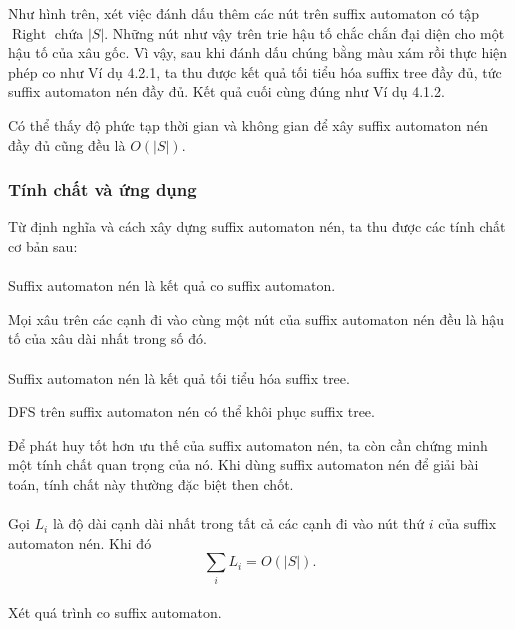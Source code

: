 \documentclass[11pt]{article}
\begin{document}
Như hình trên, xét việc đánh dấu thêm các nút trên suffix automaton có tập
\(\operatorname{Right}\) chứa \(|S|\). Những nút như vậy trên trie hậu tố chắc
chắn đại diện cho một hậu tố của xâu gốc. Vì vậy, sau khi đánh dấu chúng bằng
màu xám rồi thực hiện phép co như Ví dụ 4.2.1, ta thu được kết quả tối tiểu hóa
suffix tree đầy đủ, tức suffix automaton nén đầy đủ. Kết quả cuối cùng đúng như
Ví dụ 4.1.2.

Có thể thấy độ phức tạp thời gian và không gian để xây suffix automaton nén đầy
đủ cũng đều là \(O(|S|)\).

\subsubsection{Tính chất và ứng dụng}

Từ định nghĩa và cách xây dựng suffix automaton nén, ta thu được các tính chất
cơ bản sau:

\paragraph{}
Suffix automaton nén là kết quả co suffix automaton.

Mọi xâu trên các cạnh đi vào cùng một nút của suffix automaton nén đều là hậu
tố của xâu dài nhất trong số đó.

\paragraph{}
Suffix automaton nén là kết quả tối tiểu hóa suffix tree.

DFS trên suffix automaton nén có thể khôi phục suffix tree.

Để phát huy tốt hơn ưu thế của suffix automaton nén, ta còn cần chứng minh một
tính chất quan trọng của nó. Khi dùng suffix automaton nén để giải bài toán,
tính chất này thường đặc biệt then chốt.

\paragraph{}
Gọi \(L_i\) là độ dài cạnh dài nhất trong tất cả các cạnh đi vào nút thứ \(i\)
của suffix automaton nén. Khi đó
\[
\sum_i L_i=O(|S|).
\]

\paragraph{}
Xét quá trình co suffix automaton.
\end{document}
